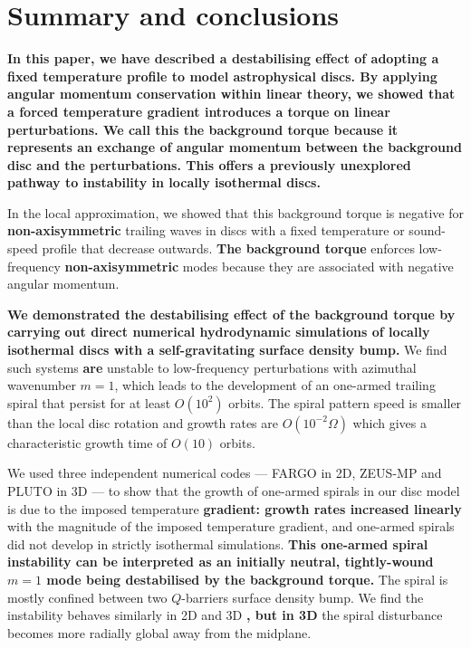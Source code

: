 
\section{Summary and conclusions}\label{summary}
{\bf
  In this paper, we have described a destabilising  
  effect of adopting a fixed temperature profile to model   
  astrophysical discs. By applying angular momentum conservation
  within linear theory, we showed that a forced temperature gradient 
  introduces a torque on linear perturbations. We call this the
  background torque because it represents an exchange of angular
  momentum between the background disc and the perturbations. This 
  offers a previously unexplored pathway to instability in locally
  isothermal discs.  
}

In the local approximation, we showed that this background torque is
negative for {\bf non-axisymmetric} trailing waves in discs with a fixed temperature or
sound-speed profile that decrease outwards. {\bf The background torque} enforces  
low-frequency {\bf non-axisymmetric} modes because they are associated
with negative angular momentum.

{\bf 
  We demonstrated the destabilising effect of the background torque by
  carrying out direct numerical hydrodynamic simulations of 
  locally isothermal discs with a self-gravitating surface density
  bump. 
}
We find such systems {\bf are} unstable to low-frequency perturbations
with azimuthal wavenumber $m=1$, which leads to the development of an one-armed 
trailing spiral that persist for at least $O(10^2)$ orbits. The spiral
pattern speed is smaller than the local disc rotation and
growth rates are $O(10^{-2}\Omega)$ which gives a characteristic
growth time of $O(10)$ orbits. 

We used three independent numerical codes --- FARGO in 2D, ZEUS-MP and
PLUTO in 3D --- to show that the growth of     
one-armed spirals in our disc model is due to the imposed
temperature {\bf gradient: growth rates increased linearly}  
with the magnitude of the imposed temperature gradient, and one-armed
spirals did not develop in strictly isothermal simulations. {\bf This 
  one-armed spiral instability can be interpreted as an initially 
  neutral, tightly-wound $m=1$ mode being destabilised by the 
  background torque.} The spiral
is mostly confined between two $Q$-barriers surface density bump. 
We find the instability behaves similarly in 2D and 3D {\bf, but in 3D}
the spiral disturbance becomes more radially global away from    
the midplane. 

